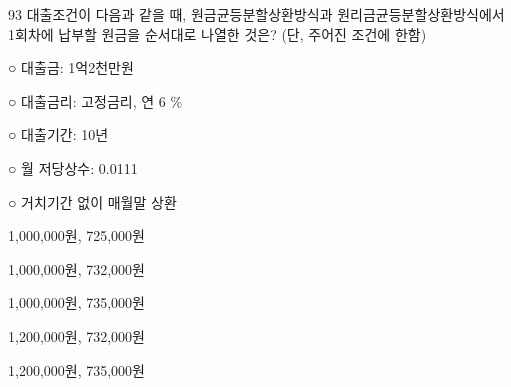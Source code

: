 \begin{question}{93}
대출조건이 다음과 같을 때, 원금균등분할상환방식과 원리금균등분할상환방식에서 1회차에 납부할 원금을 순서대로 나열한 것은? (단, 주어진 조건에 한함)
\begin{framedtext}
○ 대출금: 1억2천만원 \par
○ 대출금리: 고정금리, 연 6 \% \par
○ 대출기간: 10년 \par
○ 월 저당상수: 0.0111 \par
○ 거치기간 없이 매월말 상환
\end{framedtext}
\begin{choices}
  \item 1,000,000원, 725,000원
  \item 1,000,000원, 732,000원
  \item 1,000,000원, 735,000원
  \item 1,200,000원, 732,000원
  \item 1,200,000원, 735,000원
\end{choices}
\end{question}
